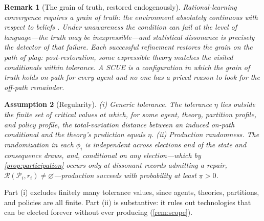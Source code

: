 \documentclass[11pt]{article}
\newtheorem{assumption}{Assumption}[section]
\newtheorem{remark}[assumption]{Remark}
\theoremstyle{definition}
\newcommand{\emptysetset}{\varnothing}
\begin{document}
\begin{remark}[The grain of truth, restored endogenously]
\label{rem:grain}
Rational-learning convergence requires a grain of truth: the environment
absolutely continuous with respect to beliefs \citep{KalaiLehrer1993a}.
Under unawareness the condition can fail at the level of language---the
truth may be inexpressible---and statistical dissonance is precisely the
detector of that failure.  Each successful refinement restores the grain
\emph{on the path of play}: post-restoration, some expressible theory
matches the visited conditionals within tolerance.  A SCUE is a
configuration in which the grain of truth holds on-path for every agent and
no one has a priced reason to look for the off-path remainder.
\end{remark}

\begin{assumption}[Regularity]
\label{ass:regularity}
(i) \emph{Generic tolerance.}  The tolerance $\eta$ lies outside the finite
set of critical values at which, for some agent, theory, partition profile,
and policy profile, the total-variation distance between an induced on-path
conditional and the theory's prediction equals $\eta$.
(ii) \emph{Production randomness.}  The randomization in each $\phi_i$ is
independent across elections and of the state and consequence draws, and,
conditional on any election---which by \cref{prop:participation} occurs only
at dissonant records admitting a repair,
$\mathcal R(\mathcal P_i,r_i)\neq\emptysetset$---production succeeds with
probability at least $\underline\pi>0$.
\end{assumption}

Part (i) excludes finitely many tolerance values, since agents, theories,
partitions, and policies are all finite.  Part (ii) is substantive: it rules
out technologies that can be elected forever without ever producing
(\cref{rem:scope}).
\end{document}
